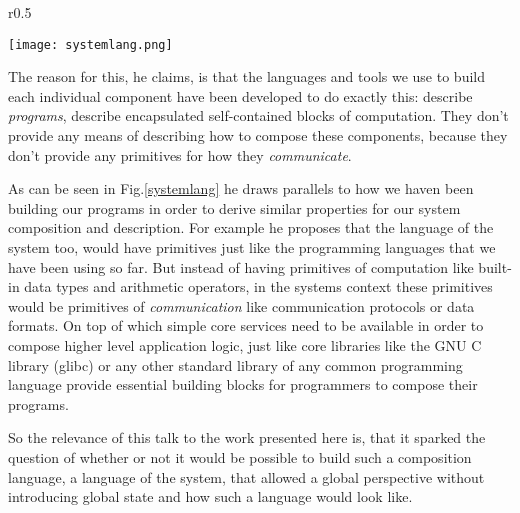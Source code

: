 \begin{wrapfigure}{r}{0.5\textwidth}

  \texttt{[image: systemlang.png]}
  \caption{Slide-excerp from the talk ``The Language of the System'' by
          Rich Hickey that draws parallels between the composition of
          (local) programs and distributed systems.}
  \label{systemlang}

\end{wrapfigure}

The reason for this, he claims, is that the languages and tools
we use to build each individual component have been developed to
do exactly this: describe \textit{programs}, describe encapsulated
self-contained blocks of computation. They don't provide any
means of describing how to compose these components, because they
don't provide any primitives for how they \textit{communicate}.

As can be seen in Fig.\ref{systemlang} he draws parallels to how
we haven been building our programs in order to derive similar
properties for our system composition and description. For example
he proposes that the language of the system too, would have
primitives just like the programming languages that we have been
using so far. But instead of having primitives of computation like
built-in data types and arithmetic operators, in the systems context
these primitives would be primitives of \textit{communication} like
communication protocols or data formats. On top of which simple
core services need to be available in order to compose higher
level application logic, just like core libraries like
the GNU C library (glibc) \cite{glibc} or any other standard
library of any common programming language provide essential
building blocks for programmers to compose their programs.
\newline

So the relevance of this talk to the work presented here is, that
it sparked the question of whether or not it would be possible to
build such a composition language, a language of the system,
that allowed a global perspective without introducing global
state and how such a language would look like.
\newline

